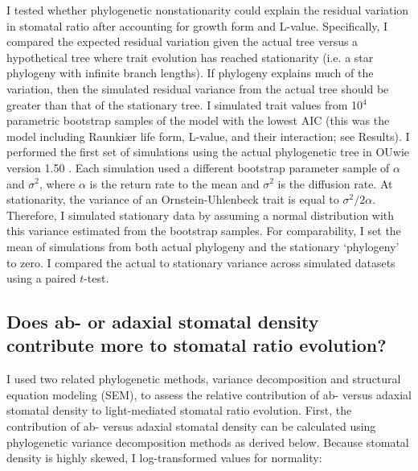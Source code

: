 \documentclass[12pt, oneside]{article}
\newcommand{\pkg}[1]{{\fontseries{b}\selectfont #1}}
\newcommand{\el}{L-value}
\begin{document}
I tested whether phylogenetic nonstationarity could explain the residual variation in stomatal ratio after accounting for growth form and \el. Specifically, I compared the expected residual variation given the actual tree versus a hypothetical tree where trait evolution has reached stationarity (i.e. a star phylogeny with infinite branch lengths). If phylogeny explains much of the variation, then the simulated residual variance from the actual tree should be greater than that of the stationary tree. I simulated trait values from 10$^4$ parametric bootstrap samples of the model with the lowest AIC (this was the model including Raunki\ae r life form, \el, and their interaction; see Results). I performed the first set of simulations using the actual phylogenetic tree in \pkg{OUwie} version 1.50 \citep{Beaulieu_OMeara_2016}. Each simulation used a different bootstrap parameter sample of $\alpha$ and $\sigma ^ 2$, where $\alpha$ is the return rate to the mean and $\sigma ^ 2$ is the diffusion rate. At stationarity, the variance of an Ornstein-Uhlenbeck trait is equal to $\sigma ^ 2 / 2 \alpha$. Therefore, I simulated stationary data by assuming a normal distribution with this variance estimated from the bootstrap samples. For comparability, I set the mean of simulations from both actual phylogeny and the stationary `phylogeny' to zero. I compared the actual to stationary variance across simulated datasets using a paired $t$-test.


\subsection*{Does ab- or adaxial stomatal density contribute more to stomatal ratio evolution?}

I used two related phylogenetic methods, variance decomposition and structural equation modeling (SEM), to assess the relative contribution of ab- versus adaxial stomatal density to light-mediated stomatal ratio evolution. First, the contribution of ab- versus adaxial stomatal density can be calculated using phylogenetic variance decomposition methods as derived below. Because stomatal density is highly skewed, I log-transformed values for normality:
 
\end{document}
